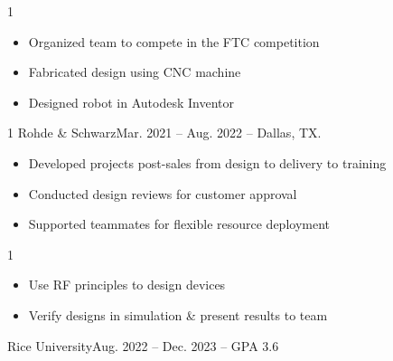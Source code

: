 \documentclass[10pt, letterpaper, ragged2e, withhyper]{AltaCV/altacv}
\def\Rohde{1}
\def\LMCO{1}
\def\FTCROBO{0}		%
\begin{document}
\begin{paracol}{2}
\if\FTCROBO1

\divider

\begin{itemize}
\item Organized team to compete in the FTC competition
\item Fabricated design using CNC machine
\item Designed robot in Autodesk Inventor
\end{itemize}
\fi

\iffalse

\divider

\cvevent{Project name}{Where \& for what}{Aug. 20XX - Dec. 20XX}{}
\begin{itemize}
\item First
\item Second
\item Last
\end{itemize}
\fi


\if\Rohde1
 {Rohde \& Schwarz}{Mar. 2021 -- Aug. 2022 -- Dallas, TX.}{}
\begin{itemize}
\item Developed projects post-sales from design to delivery to training
\item Conducted design reviews for customer approval
\item Supported teammates for flexible resource deployment
\end{itemize}
\divider
\fi

\if\LMCO1
 {}
\begin{itemize}
\item Use RF principles to design devices
\item Verify designs in simulation \& present results to team
\end{itemize}
\fi

\switchcolumn

 {Rice University}{Aug. 2022 -- Dec. 2023 -- GPA 3.6}{}


\end{paracol}
\end{document}
